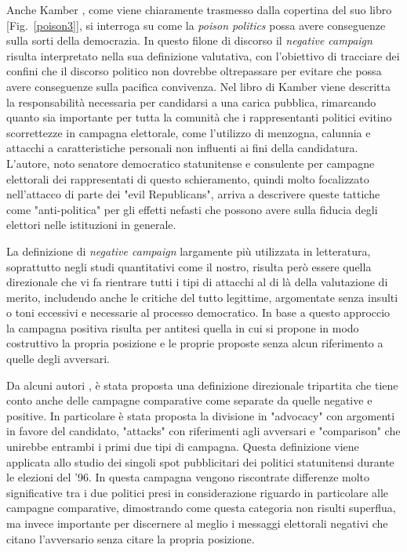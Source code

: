 Anche Kamber \citep{kamber1997}, come viene chiaramente trasmesso dalla copertina del suo libro [Fig.~\ref{poison3}], si interroga su come la \textit{poison politics} possa avere conseguenze sulla sorti della democrazia. In questo filone di discorso il \textit{negative campaign} risulta interpretato nella sua definizione valutativa, con l’obiettivo di tracciare dei confini che il discorso politico non dovrebbe oltrepassare per evitare che possa avere conseguenze sulla pacifica convivenza.
Nel libro di Kamber viene descritta la responsabilità necessaria per candidarsi a una carica pubblica, rimarcando quanto sia importante per tutta la comunità che i rappresentanti politici evitino scorrettezze in campagna elettorale, come l'utilizzo di menzogna, calunnia e attacchi a caratteristiche personali non influenti ai fini della candidatura. L'autore, noto senatore democratico statunitense e consulente per campagne elettorali dei rappresentati di questo schieramento, quindi molto focalizzato nell'attacco di parte dei "evil Republicans",  arriva a descrivere queste tattiche come "anti-politica" per gli effetti nefasti che possono avere sulla fiducia degli elettori nelle istituzioni in generale.

La definizione di \textit{negative campaign} largamente più utilizzata in letteratura, soprattutto negli studi quantitativi come il nostro, risulta però essere quella direzionale che vi fa rientrare tutti i tipi di attacchi al di là della valutazione di merito, includendo anche le critiche del tutto legittime, argomentate senza insulti o toni eccessivi e necessarie al processo democratico. In base a questo approccio la campagna positiva risulta per antitesi quella in cui si propone in modo costruttivo la propria posizione e le proprie proposte senza alcun riferimento a quelle degli avversari.

Da alcuni autori \citep{jamieson1997} \citep{jamieson1998}, è stata proposta una definizione direzionale tripartita che tiene conto anche delle campagne comparative come separate da quelle negative e positive. In particolare è stata proposta la divisione in "advocacy" con argomenti in favore del candidato, "attacks" con riferimenti agli avversari e "comparison" che unirebbe entrambi i primi due tipi di campagna. Questa definizione viene applicata allo studio dei singoli spot pubblicitari dei politici statunitensi durante le elezioni del '96. In questa campagna vengono riscontrate differenze molto significative tra i due politici presi in considerazione riguardo in particolare alle campagne comparative, dimostrando come questa categoria non risulti superflua, ma invece importante per discernere al meglio i messaggi elettorali negativi che citano l'avversario senza citare la propria posizione.

